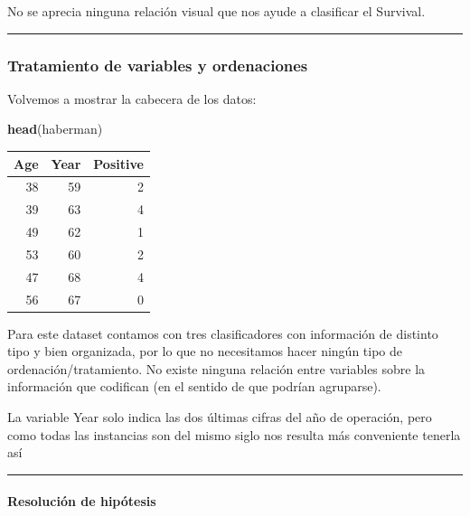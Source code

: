 \documentclass[
]{article}
\newenvironment{Shaded}{\begin{snugshade}}{\end{snugshade}}
\newcommand{\KeywordTok}[1]{\textcolor[rgb]{0.13,0.29,0.53}{\textbf{#1}}}
\newcommand{\NormalTok}[1]{#1}
\begin{document}
No se aprecia ninguna relación visual que nos ayude a clasificar el
Survival.

\begin{center}\rule{0.5\linewidth}{0.5pt}\end{center}

\hypertarget{tratamiento-de-variables-y-ordenaciones}{%
\subsubsection{Tratamiento de variables y
ordenaciones}\label{tratamiento-de-variables-y-ordenaciones}}

Volvemos a mostrar la cabecera de los datos:

\begin{Shaded}
\begin{Highlighting}[]
\KeywordTok{head}\NormalTok{(haberman)}
\end{Highlighting}
\end{Shaded}

\begin{tabular}{r|r|r}
\hline
Age & Year & Positive\\
\hline
38 & 59 & 2\\
\hline
39 & 63 & 4\\
\hline
49 & 62 & 1\\
\hline
53 & 60 & 2\\
\hline
47 & 68 & 4\\
\hline
56 & 67 & 0\\
\hline
\end{tabular}

Para este dataset contamos con tres clasificadores con información de
distinto tipo y bien organizada, por lo que no necesitamos hacer ningún
tipo de ordenación/tratamiento. No existe ninguna relación entre
variables sobre la información que codifican (en el sentido de que
podrían agruparse).

La variable Year solo indica las dos últimas cifras del año de
operación, pero como todas las instancias son del mismo siglo nos
resulta más conveniente tenerla así

\begin{center}\rule{0.5\linewidth}{0.5pt}\end{center}

\hypertarget{resoluciuxf3n-de-hipuxf3tesis}{%
\paragraph{Resolución de
hipótesis}\label{resoluciuxf3n-de-hipuxf3tesis}}
\end{document}
